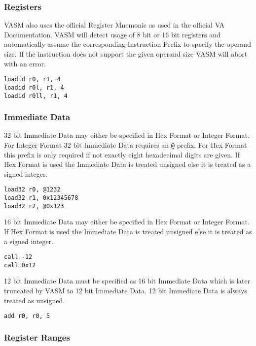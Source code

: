 \subsubsection{Registers}

VASM also uses the official Register Mnemonic as used in the official VA Documentation. VASM will detect usage of 8 bit or 16 bit registers
and automatically assume the corresponding Instruction Prefix to specify the operand size. If the instruction does not support the given operand size
VASM will abort with an error.

\begin{verbatim}
loadid r0, r1, 4
loadid r0l, r1, 4
loadid r0ll, r1, 4
\end{verbatim}

\subsubsection{Immediate Data}


32 bit Immediate Data may either be specified in Hex Format or Integer Format. For Integer Format 32 bit Immediate Data requires an \verb|@| prefix.
For Hex Format this prefix is only required if not exactly eight hexadecimal digits are given. If Hex Format is used the Immediate Data is treated
unsigned else it is treated as a signed integer. 

\begin{verbatim}
load32 r0, @1232
load32 r1, 0x12345678
load32 r2, @0x123
\end{verbatim}


16 bit Immediate Data may either be specified in Hex Format or Integer Format. If Hex Format is used the Immediate Data is treated
unsigned else it is treated as a signed integer.

\begin{verbatim}
call -12
call 0x12
\end{verbatim}


12 bit Immediate Data must be specified as 16 bit Immediate Data which is later truncated by VASM to 12 bit Immediate Data. 12 bit Immediate Data is
always treated as unsigned.

\begin{verbatim}
add r0, r0, 5
\end{verbatim}

\subsubsection{Register Ranges}


